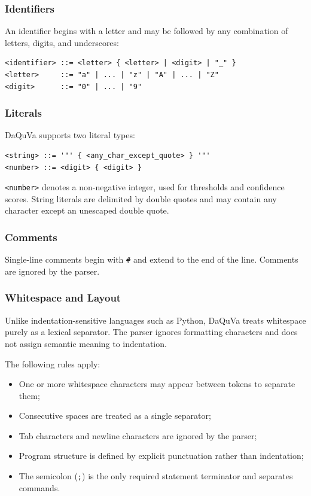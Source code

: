 \begin{itemize}[label=-, noitemsep]
\subsubsection{Identifiers}

An identifier begins with a letter and may be followed by any combination of
letters, digits, and underscores:

\begin{lstlisting}[style=bnf]
<identifier> ::= <letter> { <letter> | <digit> | "_" }
<letter>     ::= "a" | ... | "z" | "A" | ... | "Z"
<digit>      ::= "0" | ... | "9"
\end{lstlisting}

\subsubsection{Literals}

DaQuVa supports two literal types:

\begin{lstlisting}[style=bnf]
<string> ::= '"' { <any_char_except_quote> } '"'
<number> ::= <digit> { <digit> }
\end{lstlisting}

\texttt{<number>} denotes a non-negative integer, used for thresholds and
confidence scores. String literals are delimited by double quotes and may
contain any character except an unescaped double quote.

\subsubsection{Comments}

Single-line comments begin with \texttt{\#} and extend to the end of the line.
Comments are ignored by the parser.

\subsubsection{Whitespace and Layout}

Unlike indentation-sensitive languages such as Python, DaQuVa treats
whitespace purely as a lexical separator. The parser ignores formatting
characters and does not assign semantic meaning to indentation.

The following rules apply:

\begin{itemize}[label=-, noitemsep]
  \item One or more whitespace characters may appear between tokens
          to separate them;
    \item Consecutive spaces are treated as a single separator;
    \item Tab characters and newline characters are ignored by the parser;
    \item Program structure is defined by explicit punctuation rather than
          indentation;
    \item The semicolon (\texttt{;}) is the only required statement
          terminator and separates commands.
\end{itemize}


\end{itemize}
